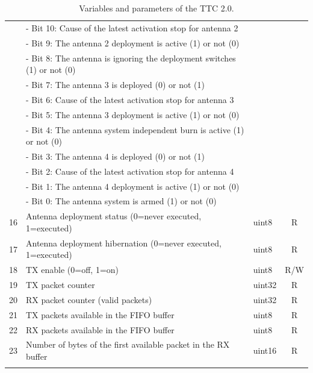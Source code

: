 \begin{longtable}[c]{cL{0.72\textwidth}lc}
        & - Bit 10: Cause of the latest activation stop for antenna 2       &        &   \\
        & - Bit 9: The antenna 2 deployment is active (1) or not (0)        &        &   \\
        & - Bit 8: The antenna is ignoring the deployment switches (1) or not (0) &  &   \\
        & - Bit 7: The antenna 3 is deployed (0) or not (1)                 &        &   \\
        & - Bit 6: Cause of the latest activation stop for antenna 3        &        &   \\
        & - Bit 5: The antenna 3 deployment is active (1) or not (0)        &        &   \\
        & - Bit 4: The antenna system independent burn is active (1) or not (0) &    &   \\
        & - Bit 3: The antenna 4 is deployed (0) or not (1)                 &        &   \\
        & - Bit 2: Cause of the latest activation stop for antenna 4        &        &   \\
        & - Bit 1: The antenna 4 deployment is active (1) or not (0)        &        &   \\
        & - Bit 0: The antenna system is armed (1) or not (0)               &        &   \\
    16  & Antenna deployment status (0=never executed, 1=executed)          & uint8  & R \\
    17  & Antenna deployment hibernation (0=never executed, 1=executed)     & uint8  & R \\
    18  & TX enable (0=off, 1=on)                                           & uint8  & R/W \\
    19  & TX packet counter                                                 & uint32 & R \\
    20  & RX packet counter (valid packets)                                 & uint32 & R \\
    21  & TX packets available in the FIFO buffer                           & uint8  & R \\
    22  & RX packets available in the FIFO buffer                           & uint8  & R \\
    23  & Number of bytes of the first available packet in the RX buffer    & uint16 & R \\
    \bottomrule[1.5pt]
    \caption{Variables and parameters of the TTC 2.0.}
    \label{tab:ttc2-variables}
\end{longtable}

